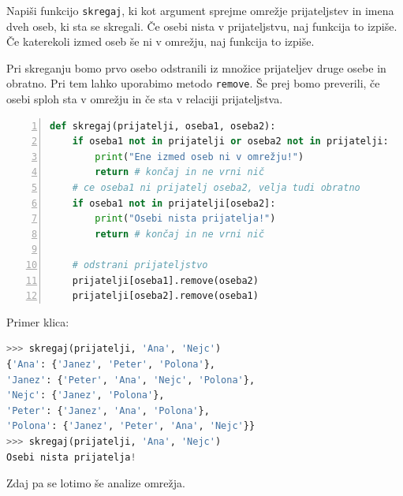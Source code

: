 \begin{zgled}
Napiši funkcijo \texttt{skregaj}, ki kot argument sprejme omrežje prijateljstev in imena dveh oseb, ki sta se skregali. Če osebi nista v prijateljstvu, naj funkcija to izpiše. Če katerekoli izmed oseb še ni v omrežju, naj funkcija to izpiše. 
\end{zgled}
\begin{resitev}
Pri skreganju bomo prvo osebo odstranili iz množice prijateljev druge osebe in obratno. Pri tem lahko uporabimo metodo \texttt{remove}. Še prej bomo preverili, če osebi sploh sta v omrežju in če sta v relaciji prijateljstva.
\begin{lstlisting}[language=Python,numbers=left]
def skregaj(prijatelji, oseba1, oseba2):
    if oseba1 not in prijatelji or oseba2 not in prijatelji:
        print("Ene izmed oseb ni v omrežju!")
        return # končaj in ne vrni nič
    # ce oseba1 ni prijatelj oseba2, velja tudi obratno
    if oseba1 not in prijatelji[oseba2]:    
        print("Osebi nista prijatelja!")
        return # končaj in ne vrni nič
    
    # odstrani prijateljstvo
    prijatelji[oseba1].remove(oseba2)
    prijatelji[oseba2].remove(oseba1)
\end{lstlisting}
Primer klica:
\begin{lstlisting}[language=Python]
>>> skregaj(prijatelji, 'Ana', 'Nejc')
{'Ana': {'Janez', 'Peter', 'Polona'}, 
'Janez': {'Peter', 'Ana', 'Nejc', 'Polona'}, 
'Nejc': {'Janez', 'Polona'}, 
'Peter': {'Janez', 'Ana', 'Polona'}, 
'Polona': {'Janez', 'Peter', 'Ana', 'Nejc'}}
>>> skregaj(prijatelji, 'Ana', 'Nejc')
Osebi nista prijatelja!
\end{lstlisting}
\end{resitev}

Zdaj pa se lotimo še analize omrežja.

